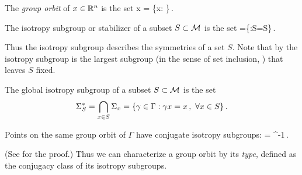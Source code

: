 The \emph{group orbit} of $x\in\mathbb{R}^{n}$ is the set
\beq
	\Gamma x = \{\gamma x: \gamma\in\Gamma\}\,.
\eeq


\begin{definition}
\label{def:stab}
 The isotropy subgroup or stabilizer of a subset $S\subset \mathcal{M}$ is the set
 \beq
  	=\{\gamma\in\Gamma:\gamma S=S\}\,.
 \eeq
\end{definition}
Thus the isotropy subgroup describes the symmetries of a set $S$. Note that by
 the isotropy subgroup is the largest subgroup (in the
sense of set inclusion, \cf {}) that leaves $S$ fixed.


\begin{definition}
\label{def:GlobStab}
 The global isotropy subgroup of a subset $S\subset \mathcal{M}$ is the set
 \[
  	\Sigma^*_{S}=\bigcap_{x\in S} \Sigma_{x} = \{\gamma\in\Gamma:\gamma x=x\,,\ \forall x\in S\}\,.
 \]
\end{definition}


\begin{lemma}
\label{lem:stabGorbit}
Points on the same group orbit of $\Gamma$ have conjugate isotropy subgroups:
\beq
	=\gamma {} \gamma^{-1}\,.
\eeq
\end{lemma}
(See  for the proof.)
%
Thus we can characterize a group orbit by its \emph{type}, defined
as the conjugacy class of its isotropy subgroups.


